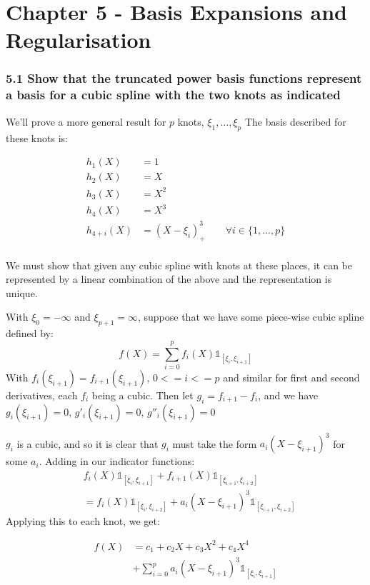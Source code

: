 
\chapter{Chapter 5 - Basis Expansions and Regularisation}

\subsection*{5.1 Show that the truncated power basis functions represent a basis for a cubic spline with the two knots as indicated}

We'll prove a more general result for $p$ knots, $\xi_1, \dots, \xi_p$
The basis described for these knots is:

\begin{align*}
    h_1(X) &= 1 \\
    h_2(X) &= X \\
    h_3(X) &= X^2 \\
    h_4(X) &= X^3 \\
    h_{4+i}(X) &= (X-\xi_i)^3_+ \hspace{2em} \forall i \in \{1,\dots,p\} \\
\end{align*}

We must show that given any cubic spline with knots at these places, it can be represented by a linear combination of the above and the representation is unique.

With $\xi_0 = -\infty$ and $\xi_{p+1} = \infty$, suppose that we have some piece-wise cubic spline defined by: 
$$f(X) = \sum_{i=0}^p f_i(X)\mathbb{1}_{[\xi_i,\xi_{i+1}]}$$
With $f_i(\xi_{i+1}) = f_{i+1}(\xi_{i+1})$, $0 <= i <= p$ and similar for first and second derivatives, each $f_i$ being a cubic.
Then let $g_i = f_{i+1} - f_i$, and we have $g_i(\xi_{i+1})  = 0$,  $g'_i(\xi_{i+1})  = 0$,  $g''_i(\xi_{i+1})  = 0$

$g_i$ is a cubic, and so it is clear that $g_i$ must take the form $a_i(X - \xi_{i+1})^3$ for some $a_i$. Adding in our indicator functions:
\begin{align*}
    & f_i(X)\mathbb{1}_{[\xi_i,\xi_{i+1}]} + f_{i+1}(X)\mathbb{1}_{[\xi_{i+1},\xi_{i+2}]} \\
    &=  f_{i}(X)\mathbb{1}_{[\xi_i,\xi_{i+2}]} + a_i(X - \xi_{i+1})^3\mathbb{1}_{[\xi_{i+1},\xi_{i+2}]}
\end{align*}
Applying this to each knot, we get:

\begin{align*}
    f(X) &= c_1 + c_2 X + c_3 X^2 + c_4 X^4 \\
    &+ \sum_{i=0}^p a_i (X - \xi_{i+1})^3 \mathbb{1}_{[\xi_i,\xi_{i+1}]}
\end{align*}

